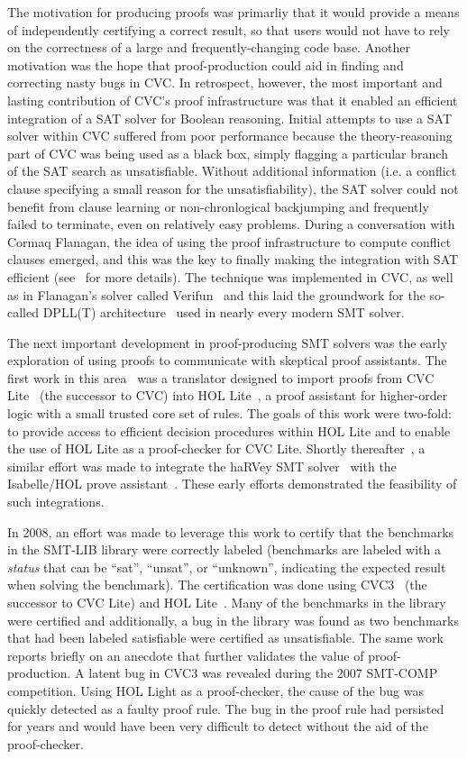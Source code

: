 \documentclass{llncs}
\begin{document}
The motivation for producing proofs was primarliy that it would provide a means
of independently certifying a correct result,
so that users would not have to rely on the correctness of a large and
frequently-changing code base.  Another motivation was the hope that
proof-production could aid in finding and correcting nasty bugs in CVC.
In retrospect, however, the most important and lasting contribution of CVC's
proof infrastructure was that it enabled an efficient integration of a SAT
solver for Boolean reasoning.  Initial attempts to use a SAT solver within
CVC suffered from poor performance because the theory-reasoning part of CVC
was being used as a black box, simply flagging a particular branch of the SAT
search as unsatisfiable.  Without additional information (i.e. a conflict
clause specifying a small reason for the unsatisfiability), the SAT solver could
not benefit from clause learning or non-chronlogical backjumping and frequently
failed to terminate, even on relatively easy problems.  During a conversation
with Cormaq Flanagan, the idea of using the proof infrastructure to compute
conflict clauses emerged, and this was the key to finally making the
integration with SAT efficient (see~\cite{BDS02-CAV02} for more details).  The
technique was implemented in CVC, as well as in Flanagan's solver called
Verifun~\cite{FJO+03} and this laid the groundwork for the so-called DPLL(T)
architecture~\cite{NieOT-JACM-06} used in nearly every modern SMT solver.

The next important development in proof-producing SMT solvers was the
early exploration of using proofs to communicate with skeptical proof
assistants.  The first work in this area~\cite{MBG06} was a translator designed
to import proofs from CVC Lite~\cite{BB04} (the successor to CVC) into HOL
Lite~\cite{H96}, a proof assistant for higher-order logic with a small trusted
core set of rules.  The goals of this work were two-fold: to provide access to
efficient decision procedures within HOL Lite and to enable the use of HOL Lite
as a proof-checker for CVC Lite.  Shortly thereafter~\cite{FMM+06,HCF+07}, a similar effort was
made to integrate the haRVey SMT solver~\cite{DR03} with the Isabelle/HOL prove
assistant~\cite{NPW02}. These early efforts demonstrated the feasibility of such
integrations.

In 2008, an effort was made to leverage this work to certify that the
benchmarks in the SMT-LIB library were correctly labeled (benchmarks are
labeled with a \emph{status} that can be ``sat'', ``unsat'', or ``unknown'',
indicating the expected result when solving the benchmark).  The certification
was done using CVC3~\cite{BT07} (the successor to CVC Lite) and
HOL Lite~\cite{GB08}.  Many of the benchmarks in the library were certified and
additionally, a bug in the library was found as two benchmarks that had been
labeled satisfiable were certified as unsatisfiable.
The same work reports briefly on an anecdote that further validates the value
of proof-production.  A latent bug in CVC3 was revealed during the 2007
SMT-COMP competition.  Using HOL Light as a proof-checker, the cause of the bug
was quickly detected as a faulty proof rule.  The bug in the proof rule had
persisted for years and would have been very difficult to detect without the
aid of the proof-checker.
\end{document}

